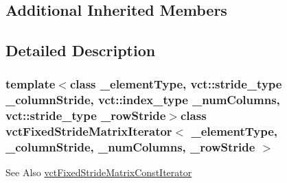 \subsection*{Additional Inherited Members}


\subsection{Detailed Description}
\subsubsection*{template$<$class \-\_\-element\-Type, vct\-::stride\-\_\-type \-\_\-column\-Stride, vct\-::index\-\_\-type \-\_\-num\-Columns, vct\-::stride\-\_\-type \-\_\-row\-Stride$>$class vct\-Fixed\-Stride\-Matrix\-Iterator$<$ \-\_\-element\-Type, \-\_\-column\-Stride, \-\_\-num\-Columns, \-\_\-row\-Stride $>$}

\begin{DoxySeeAlso}{See Also}
\hyperlink{classvct_fixed_stride_matrix_const_iterator}{vct\-Fixed\-Stride\-Matrix\-Const\-Iterator} 
\end{DoxySeeAlso}


